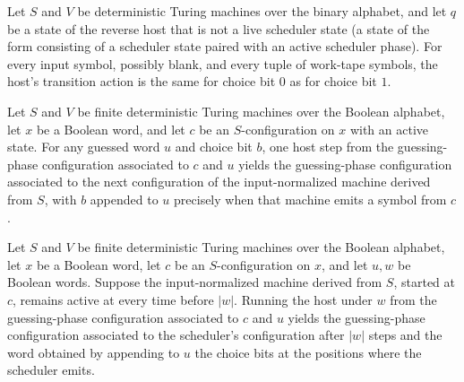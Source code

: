 \begin{lemma}
\label{Complexity.b2_tables_coincide}
\leanok
{}
Let $S$ and $V$ be deterministic Turing machines over the binary alphabet, and let $q$
be a state of the reverse host that is not a live scheduler state (a state of the form
consisting of a scheduler state paired with an active scheduler phase). For every input
symbol, possibly blank, and every tuple of work-tape symbols, the host's transition
action is the same for choice bit $0$ as for choice bit $1$.
\end{lemma}

\begin{lemma}
\label{Complexity.b2_guess_step}
\leanok
{}
Let $S$ and $V$ be finite deterministic Turing machines over the Boolean alphabet, let
$x$ be a Boolean word, and let $c$ be an $S$-configuration on $x$ with an active state.
For any guessed word $u$ and choice bit $b$, one host step from the guessing-phase
configuration associated to $c$ and $u$ yields the guessing-phase configuration
associated to the next configuration of the input-normalized machine derived from $S$,
with $b$ appended to $u$ precisely when that machine emits a symbol from $c$.
\end{lemma}

\begin{lemma}
\label{Complexity.b2_guess_run}
\leanok
{}
Let $S$ and $V$ be finite deterministic Turing machines over the Boolean alphabet, let
$x$ be a Boolean word, let $c$ be an $S$-configuration on $x$, and let $u,w$ be Boolean
words. Suppose the input-normalized machine derived from $S$, started at $c$, remains
active at every time before $|w|$. Running the host under $w$ from the guessing-phase
configuration associated to $c$ and $u$ yields the guessing-phase configuration
associated to the scheduler's configuration after $|w|$ steps and the word obtained by
appending to $u$ the choice bits at the positions where the scheduler emits.
\end{lemma}

